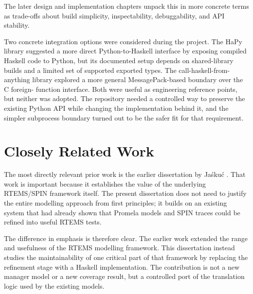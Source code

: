 The later design and implementation chapters unpack this in more
concrete terms as trade-offs about build simplicity, inspectability,
debuggability, and API stability.


Two concrete integration options were considered during the project.
The HaPy library \citep{fisher2014hapy} suggested a more direct
Python-to-Haskell interface by exposing compiled Haskell code to
Python, but its documented setup depends on shared-library builds and
a limited set of supported exported types. The
call-haskell-from-anything library \citep{hambuechen2011callhaskell}
explored a more general MessagePack-based boundary over the C foreign-
function interface. Both were useful as engineering reference points,
but neither was adopted. The repository needed a controlled way to
preserve the existing Python API while changing the implementation
behind it, and the simpler subprocess boundary turned out to be the
safer fit for that requirement.


\section{Closely Related Work}

The most directly relevant prior work is the earlier dissertation by
Ja{\'s}ku{\'c} \citep{jaskuc2022barrier}. That work is important
because it establishes the value of the underlying RTEMS/SPIN
framework itself. The present dissertation does not need to justify
the entire modelling approach from first principles; it builds on an
existing system that had already shown that Promela models and SPIN
traces could be refined into useful RTEMS tests.

The difference in emphasis is therefore clear. The earlier work
extended the range and usefulness of the RTEMS modelling framework.
This dissertation instead studies the maintainability of one critical
part of that framework by replacing the refinement stage with a
Haskell implementation. The contribution is not a new manager model or
a new coverage result, but a controlled port of the translation logic
used by the existing models.

